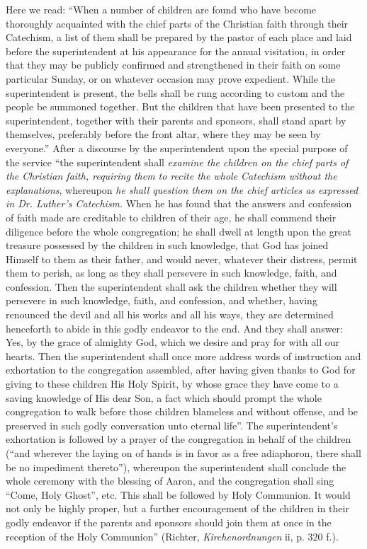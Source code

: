Here we read: “When a number of children are found who have become thoroughly acquainted with the chief parts of the Christian faith through their Catechism, a list of them shall be prepared by the pastor of each place and laid before the superintendent at his appearance for the annual visitation, in order that they may be publicly confirmed and strengthened in their faith on some particular Sunday, or on whatever occasion may prove expedient. While the superintendent is present, the bells shall be rung according to custom and the people be summoned together. But the children that have been presented to the superintendent, together with their parents and sponsors, shall stand apart by themselves, preferably before the front altar, where they may be seen by everyone.” After a discourse by the superintendent upon the special purpose of the service “the superintendent shall \emph{examine the children on the chief parts of the Christian faith, requiring them to recite the whole Catechism without the explanations}, whereupon \emph{he shall question them on the chief articles as expressed in Dr. Luther’s Catechism}. When he has found that the answers and confession of faith made are creditable to children of their age, he shall commend their diligence before the whole congregation; he shall dwell at length upon the great treasure possessed by the children in such knowledge, that God has joined Himself to them as their father, and would never, whatever their distress, permit them to perish, as long as they shall persevere in such knowledge, faith, and confession. Then the superintendent shall ask the children whether they will persevere in such knowledge, faith, and confession, and whether, having renounced the devil and all his works and all his ways, they are determined henceforth to abide in this godly endeavor to the end. And they shall answer: Yes, by the grace of almighty God, which we
desire and pray for with all our hearts. Then the superintendent shall once more address words of instruction and exhortation to the congregation assembled, after having given thanks to God for giving to these children His Holy Spirit, by whose grace they have come to a saving knowledge of His dear Son, a fact which should prompt the whole congregation to walk before those children blameless and without offense, and be preserved in such godly conversation unto eternal life”. The superintendent’s exhortation is followed by a prayer of the congregation in behalf of the children (“and wherever the laying on of hands is in favor as a free adiaphoron, there shall be no impediment thereto”), whereupon the superintendent shall conclude the whole ceremony with the blessing of Aaron, and the congregation shall sing “Come, Holy Ghost”, etc. This shall be followed by Holy Communion. It would not only be highly proper, but a further encouragement of the children in their godly endeavor if the parents and sponsors should join them at once in the reception of the Holy Communion” (Richter, \emph{Kirchenordnungen} ii, p. 320 f.).

